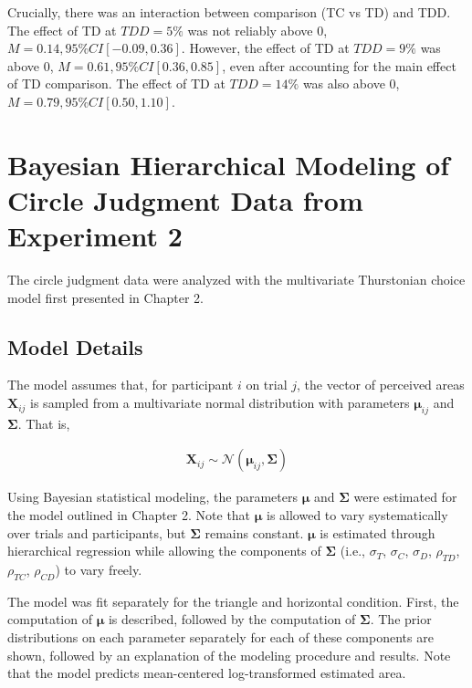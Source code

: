 Crucially, there was an interaction between comparison (TC vs TD) and TDD. The effect of TD at $TDD=5\%$ was not reliably above 0, $\mathit{M}=0.14, 95\%CI [-0.09, 0.36]$. However, the effect of TD at $TDD=9\%$ was above 0, $\mathit{M}=0.61, 95\%CI [0.36, 0.85]$, even after accounting for the main effect of TD comparison. The effect of TD at $TDD=14\%$ was also above 0, $\mathit{M}=0.79, 95\%CI [0.50, 1.10]$.

\chapter{Bayesian Hierarchical Modeling of Circle Judgment Data from Experiment 2}

The circle judgment data were analyzed with the multivariate Thurstonian choice model first presented in Chapter 2. 

\section{Model Details}

The model assumes that, for participant $i$ on trial $j$, the vector of perceived areas $\boldsymbol{X}_{ij}$ is sampled from a multivariate normal distribution with parameters $\boldsymbol{\mu}_{ij}$ and $\boldsymbol{\Sigma}$. That is,

\begin{align}
    \boldsymbol{X}_{ij} \sim \mathcal{N}(\boldsymbol{\mu}_{ij}, \boldsymbol{\Sigma})
\end{align}

Using Bayesian statistical modeling, the parameters $\boldsymbol{\mu}$ and $\boldsymbol{\Sigma}$ were estimated for the model outlined in Chapter 2. Note that $\boldsymbol{\mu}$ is allowed to vary systematically over trials and participants, but $\boldsymbol{\Sigma}$ remains constant. $\boldsymbol{\mu}$ is estimated through hierarchical regression while allowing the components of $\boldsymbol{\Sigma}$ (i.e., $\sigma_{T}$, $\sigma_{C}$, $\sigma_{D}$, $\rho_{TD}$, $\rho_{TC}$, $\rho_{CD}$) to vary freely. 

The model was fit separately for the triangle and horizontal condition. First, the computation of $\boldsymbol{\mu}$ is described, followed by the computation of $\boldsymbol{\Sigma}$. The prior distributions on each parameter separately for each of these components are shown, followed by an explanation of the modeling procedure and results. Note that the model predicts mean-centered log-transformed estimated area.

